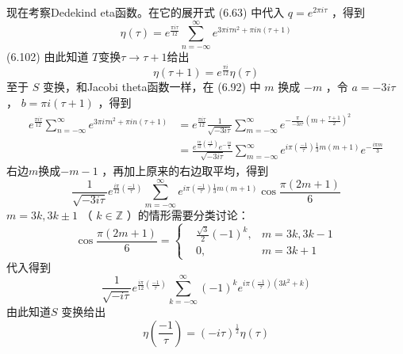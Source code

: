 现在考察Dedekind eta函数。在它的展开式 (6.63) 中代入 $q=e^{2 \pi i \tau}$ ，得到
\begin{equation}
	\eta(\tau)=e^{\frac{\pi i \tau}{12}} \sum_{n=-\infty}^{\infty} e^{3 \pi i \tau n^{2}+\pi i n(\tau+1)}
\end{equation} \quad \quad (6.102)
由此知道 $T $变换$ \tau \rightarrow \tau+1 $给出
\begin{equation}
	\eta(\tau+1)=e^{\frac{\pi i}{12}} \eta(\tau)
\end{equation} 
至于 $S$ 变换，和Jacobi theta函数一样，在 (6.92) 中 $m$ 换成 $-m$ ，令 $a=-3 i \tau $， $b=\pi i(\tau+1)$ ，得到
\begin{equation}
	\begin{aligned} e^{\frac{\pi i \tau}{12}} \sum_{n=-\infty}^{\infty} e^{3 \pi i \tau n^{2}+\pi i n(\tau+1)} &=e^{\frac{\pi i \tau}{12}} \frac{1}{\sqrt{-3 i \tau}} \sum_{m=-\infty}^{\infty} e^{-\frac{\pi}{-3 i \tau}\left(m+\frac{\tau+1}{2}\right)^{2}} \\ &=\frac{e^{\frac{i \pi}{12}\left(\frac{-1}{\tau}\right)} e^{-\frac{i \pi}{6}}}{\sqrt{-3 i \tau}} \sum_{m=-\infty}^{\infty} e^{i \pi\left(\frac{-1}{\tau}\right) \frac{1}{3} m(m+1)} e^{-\frac{i \pi m}{3}} \end{aligned}
\end{equation}
右边$ m $换成$ -m-1$ ，再加上原来的右边取平均，得到
\begin{equation}
	\frac{1}{\sqrt{-3 i \tau}} e^{\frac{i \pi}{12}\left(\frac{-1}{\tau}\right)} \sum_{m=-\infty}^{\infty} e^{i \pi\left(\frac{-1}{\tau}\right) \frac{1}{3} m(m+1)} \cos \frac{\pi(2 m+1)}{6}
\end{equation}
$m=3k,3k\pm 1$ （ $k\in\mathbb{Z}$ ）的情形需要分类讨论：
\begin{equation*}
\cos \frac{\pi(2 m+1)}{6}=\left\{\begin{aligned} &\frac{\sqrt{3}}{2}(-1)^{k},&m=3 k, 3 k-1 \\ &0, &m=3 k+1\ \ \ \ \ \ \end{aligned}\right.
\end{equation*}
代入得到
\begin{equation}
	\frac{1}{\sqrt{-i \tau}} e^{\frac{i \pi}{12}\left(\frac{-1}{\tau}\right)} \sum_{k=-\infty}^{\infty}(-1)^{k} e^{i \pi\left(\frac{-1}{\tau}\right)\left(3 k^{2}+k\right)} 
\end{equation}
由此知道$ S$ 变换给出
\begin{equation}
	\eta\left(\frac{-1}{\tau}\right)=(-i \tau)^{\frac{1}{2}} \eta(\tau)
\end{equation} 

